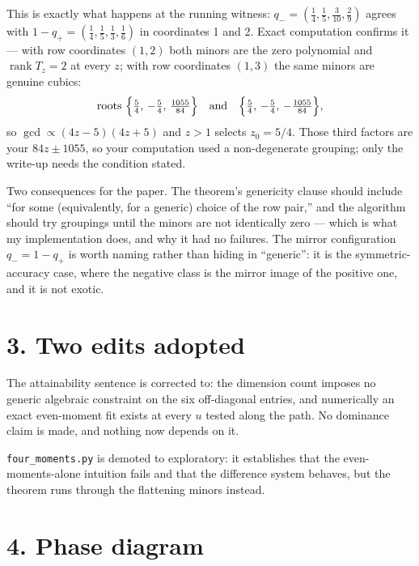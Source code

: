 \documentclass[11pt]{article}
\theoremstyle{remark}
\begin{document}
This is exactly what happens at the running witness: $q_-=(\frac14,\frac15,\frac3{10},\frac29)$ agrees with $1-q_+=(\frac14,\frac15,\frac13,\frac16)$ in coordinates 1 and 2. Exact computation confirms it --- with row coordinates $(1,2)$ both minors are the zero polynomial and $\operatorname{rank}T_z=2$ at every $z$; with row coordinates $(1,3)$ the same minors are genuine cubics:
\[
\text{roots }\Bigl\{\tfrac54,\,-\tfrac54,\,\tfrac{1055}{84}\Bigr\}\quad\text{and}\quad\Bigl\{\tfrac54,\,-\tfrac54,\,-\tfrac{1055}{84}\Bigr\},
\]
so $\gcd\propto(4z-5)(4z+5)$ and $z>1$ selects $z_0=5/4$. Those third factors are your $84z\pm1055$, so your computation used a non-degenerate grouping; only the write-up needs the condition stated.

Two consequences for the paper. The theorem's genericity clause should include ``for some (equivalently, for a generic) choice of the row pair,'' and the algorithm should try groupings until the minors are not identically zero --- which is what my implementation does, and why it had no failures. The mirror configuration $q_-=1-q_+$ is worth naming rather than hiding in ``generic'': it is the symmetric-accuracy case, where the negative class is the mirror image of the positive one, and it is not exotic.

\section*{3. Two edits adopted}

The attainability sentence is corrected to: the dimension count imposes no generic algebraic constraint on the six off-diagonal entries, and numerically an exact even-moment fit exists at every $u$ tested along the path. No dominance claim is made, and nothing now depends on it.

\texttt{four\_moments.py} is demoted to exploratory: it establishes that the even-moments-alone intuition fails and that the difference system behaves, but the theorem runs through the flattening minors instead.

\section*{4. Phase diagram}
\end{document}
